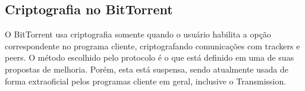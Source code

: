 
\newpage
\subsection*{Criptografia no BitTorrent}

O BitTorrent usa criptografia somente quando o usuário habilita a opção correspondente
no programa cliente, criptografando comunicações com \glspl*{tracker} e \glspl*{peer}.
O método escolhido pelo protocolo é o que está definido em uma de suas propostas de
melhoria. Porém, esta está suspensa, sendo atualmente usada de forma extraoficial
pelos programas cliente em geral, inclusive o Transmission.



